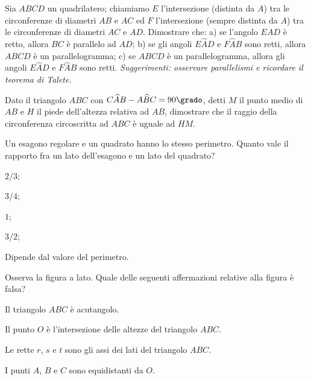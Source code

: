 \begin{esercizio}
\label{ese:5.56}
Sia $ABCD$ un quadrilatero; chiamiamo $E$ l'intersezione (distinta da 
$A$) tra le circonferenze di diametri $AB$ e $AC$ ed $F$ 
l'intersezione (sempre distinta da $A$) tra le circonferenze di 
diametri $AC$ e $AD$. Dimostrare che: a) se l'angolo $EAD$ è retto, 
allora $BC$ è parallelo ad $AD$; b) se gli angoli $E\widehat{A}D$ e 
$F\widehat{A}B$ sono retti, allora $ABCD$ è un parallelogramma; c) se 
$ABCD$ è un parallelogramma, allora gli angoli $E\widehat{A}D$ e 
$F\widehat{A}B$ sono retti. \emph{Suggerimenti: osservare 
parallelismi e ricordare il teorema di Talete.}
\end{esercizio}

\begin{esercizio}
\label{ese:5.57}
Dato il triangolo $ABC$ con $C\widehat{A}B-A\widehat{B}C=90\grado$, 
detti $M$ il punto medio di $AB$ e $H$ il piede dell'altezza relativa 
ad $AB$, dimostrare che il raggio della circonferenza circoscritta ad 
$ABC$ è uguale ad $HM$.
\end{esercizio}

\begin{esercizio}
\label{ese:5.58}
Un esagono regolare e un quadrato hanno lo stesso perimetro. Quanto 
vale il rapporto fra un lato dell'esagono e un lato del quadrato?
\begin{multicols}{2}
\begin{enumeratea}
\item $2/3$;
\item $3/4$;
\item $1$;
\item $3/2$;
\item Dipende dal valore del perimetro.
\end{enumeratea}
\end{multicols}
\end{esercizio}

\noindent\begin{minipage}{0.7\textwidth}\parindent15pt
\begin{esercizio}
\label{ese:5.59}
Osserva la figura a lato. Quale delle seguenti affermazioni relative 
alla figura è falsa?
\begin{enumeratea}
\item Il triangolo $ABC$ è acutangolo.
\item Il punto $O$ è l'intersezione delle altezze del triangolo $ABC$.
\item Le rette $r$, $s$ e $t$ sono gli assi dei lati del triangolo 
$ABC$.
\item I punti $A$, $B$ e $C$ sono equidistanti da $O$.
\end{enumeratea}
\end{esercizio}
\end{minipage}\hfil
\begin{minipage}{0.3\textwidth}
	\centering
\end{minipage}\vspace{5pt}

